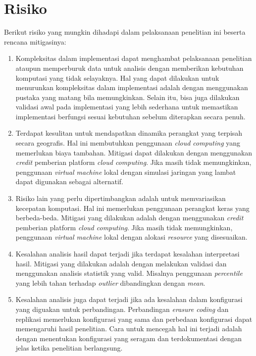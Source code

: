 \section{Risiko}
\label{sec:risiko}
Berikut risiko yang mungkin dihadapi dalam pelaksanaan penelitian ini beserta rencana mitigasinya:

\begin{enumerate}
    \item Kompleksitas dalam implementasi dapat menghambat pelaksanaan penelitian ataupun memperburuk data untuk analisis dengan memberikan kebutuhan komputasi yang tidak selayaknya. Hal yang dapat dilakukan untuk menurunkan kompleksitas dalam implementasi adalah dengan menggunakan pustaka yang matang bila memungkinkan. Selain itu, bisa juga dilakukan validasi awal pada implementasi yang lebih sederhana untuk memastikan implementasi berfungsi sesuai kebutuhan sebelum diterapkan secara penuh.
    \item Terdapat kesulitan untuk mendapatkan dinamika perangkat yang terpisah secara geografis. Hal ini membutuhkan penggunaan \textit{cloud computing} yang memerlukan biaya tambahan. Mitigasi dapat dilakukan dengan menggunakan \textit{credit} pemberian platform \textit{cloud computing}. Jika masih tidak memungkinkan, penggunaan \textit{virtual machine} lokal dengan simulasi jaringan yang lambat dapat digunakan sebagai alternatif.
    \item Risiko lain yang perlu dipertimbangkan adalah untuk memvariasikan kecepatan komputasi. Hal ini memerlukan penggunaan perangkat keras yang berbeda-beda. Mitigasi yang dilakukan adalah dengan menggunakan \textit{credit} pemberian platform \textit{cloud computing}. Jika masih tidak memungkinkan, penggunaan \textit{virtual machine} lokal dengan alokasi \textit{resource} yang disesuaikan.
    \item Kesalahan analisis hasil dapat terjadi jika terdapat kesalahan interpretasi hasil. Mitigasi yang dilakukan adalah dengan melakukan validasi dan menggunakan analisis statistik yang valid. Misalnya penggunaan \textit{percentile} yang lebih tahan terhadap \textit{outlier} dibandingkan dengan \textit{mean}.
    \item Kesalahan analisis juga dapat terjadi jika ada kesalahan dalam konfigurasi yang diguakan untuk perbandingan. Perbandingan \textit{erasure coding} dan replikasi memerlukan konfigurasi yang sama dan perbedaan konfigurasi dapat memengaruhi hasil penelitian. Cara untuk mencegah hal ini terjadi adalah dengan menentukan konfigurasi yang seragam dan terdokumentasi dengan jelas ketika penelitian berlangsung.
\end{enumerate}